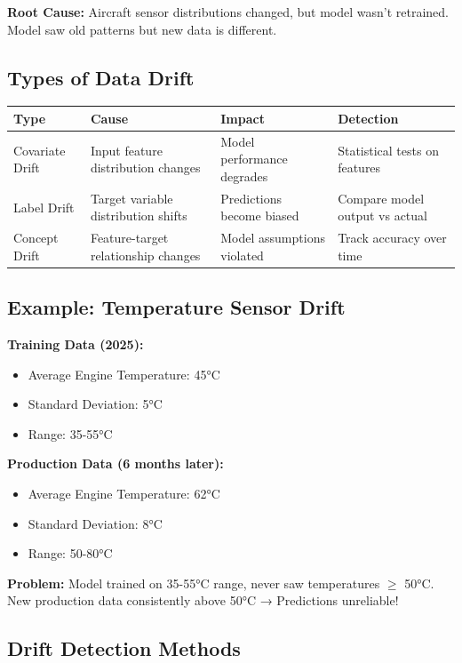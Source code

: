 \documentclass[11pt,a4paper]{article}
\begin{document}
\textbf{Root Cause:} Aircraft sensor distributions changed, but model wasn't retrained. Model saw old patterns but new data is different.

\subsection{Types of Data Drift}

\begin{table}[H]
\centering
\begin{tabular}{|l|p{3cm}|p{3cm}|p{3cm}|}
\toprule
\textbf{Type} & \textbf{Cause} & \textbf{Impact} & \textbf{Detection} \\
\midrule
Covariate Drift & Input feature distribution changes & Model performance degrades & Statistical tests on features \\
Label Drift & Target variable distribution shifts & Predictions become biased & Compare model output vs actual \\
Concept Drift & Feature-target relationship changes & Model assumptions violated & Track accuracy over time \\
\bottomrule
\end{tabular}
\end{table}

\subsection{Example: Temperature Sensor Drift}

\textbf{Training Data (2025):}
\begin{itemize}
    \item Average Engine Temperature: 45°C
    \item Standard Deviation: 5°C
    \item Range: 35-55°C
\end{itemize}

\textbf{Production Data (6 months later):}
\begin{itemize}
    \item Average Engine Temperature: 62°C
    \item Standard Deviation: 8°C
    \item Range: 50-80°C
\end{itemize}

\textbf{Problem:} Model trained on 35-55°C range, never saw temperatures $\geq$ 50°C. New production data consistently above 50°C → Predictions unreliable!

\subsection{Drift Detection Methods}
\end{document}
